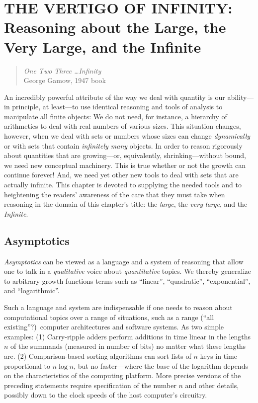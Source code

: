 
\chapter{THE VERTIGO OF INFINITY: \\
{\normalsize Reasoning about the Large, the Very Large, and the Infinite}}
\label{ch:infinity}

\begin{quote}
{\em One Two Three \ldots Infinity} \\
\hspace*{2in}George Gamow, 1947 book
\end{quote}

An incredibly powerful attribute of the way we deal with quantity is
our ability---in principle, at least---to use identical reasoning and
tools of analysis to manipulate all finite objects: We do not need,
for instance, a hierarchy of arithmetics to deal with real numbers of
various sizes.  This situation changes, however, when we deal with
sets or numbers whose sizes can change {\em dynamically} or with sets
that contain {\em infinitely many} objects.  In order to reason
rigorously about quantities that are growing---or, equivalently,
shrinking---without bound, we need new conceptual machinery.  This is
true whether or not the growth can continue forever!  And, we need yet
other new tools to deal with sets that are actually infinite.  This
chapter is devoted to supplying the needed tools and to heightening
the readers' awareness of the care that they must take when reasoning
in the domain of this chapter's title: the {\em large}, the {\em very
  large}, and the {\em Infinite}.



\section{Asymptotics}
\label{sec:asymptotics}

{\em Asymptotics}  can be viewed as a language and
a system of reasoning that allow one to talk in a {\em qualitative}
voice about {\em quantitative} topics.  We thereby generalize to
arbitrary growth functions terms such as ``linear'', ``quadratic'',
``exponential'', and ``logarithmic''.

Such a language and system are indispensable if one needs to reason
about computational topics over a range of situations, such as a range
(``all existing''?)~computer architectures and software systems.  As
two simple examples: (1) Carry-ripple adders perform additions in time
linear in the lengths $n$ of the summands (measured in number of bits)
no matter what these lengths are. (2) Comparison-based sorting
algorithms can sort lists of $n$ keys in time proportional to $n \log
n$, but no faster---where the base of the logarithm depends on the
characteristics of the computing platform.  More precise versions of
the preceding statements require specification of the number $n$ and
other details, possibly down to the clock speeds of the host
computer's circuitry.

